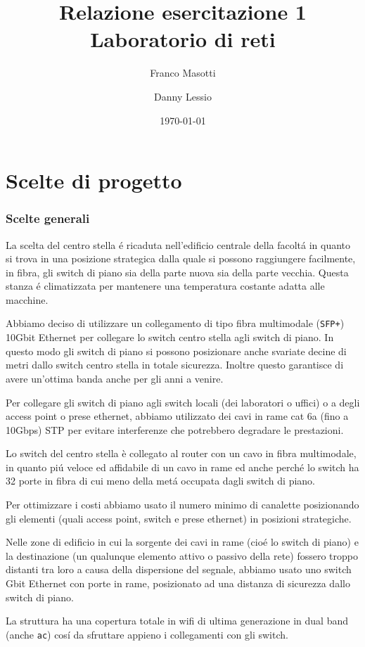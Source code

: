 \documentclass[11pt, a4paper, oneside]{article}
\title{Relazione esercitazione 1 Laboratorio di reti}
\author{Franco Masotti \and Danny Lessio}
\date{\today}
\begin{document}
	\maketitle
	\tableofcontents
	\listoffigures
	\listoftables
	\newpage
	\part{Scelte di progetto}
		\section{Scelte generali}
			\par
			La scelta del centro stella \'e ricaduta nell'edificio centrale della facolt\'a in quanto si trova in una posizione strategica dalla quale si possono raggiungere facilmente, in fibra, gli switch di piano sia della parte nuova sia della parte vecchia. Questa stanza \'e climatizzata per mantenere una temperatura costante adatta alle macchine. 
			\par
			Abbiamo deciso di utilizzare un collegamento di tipo fibra multimodale (\texttt{SFP+}) 10Gbit Ethernet per collegare lo switch centro stella agli switch di piano. In questo modo gli switch di piano si possono posizionare anche svariate decine di metri dallo switch centro stella in totale sicurezza. Inoltre questo garantisce di avere un'ottima banda anche per gli anni a venire.
			\par
			Per collegare gli switch di piano agli switch locali (dei laboratori o uffici) o a degli access point o prese ethernet, abbiamo utilizzato dei cavi in rame cat 6a (fino a 10Gbps) STP per evitare interferenze che potrebbero degradare le prestazioni.
			\par
			Lo switch del centro stella è collegato al router con un cavo in fibra multimodale, in quanto pi\'u veloce ed affidabile di un cavo in rame ed anche perch\'e lo switch ha 32 porte in fibra di cui meno della met\'a occupata dagli switch di piano.
			\par
			Per ottimizzare i costi abbiamo usato il numero minimo di canalette posizionando gli elementi (quali access point, switch e prese ethernet) in posizioni strategiche.
			\par
			Nelle zone di edificio in cui la sorgente dei cavi in rame (cio\'e lo switch di piano) e la destinazione (un qualunque elemento attivo o passivo della rete) fossero troppo distanti tra loro a causa della dispersione del segnale, abbiamo usato uno switch Gbit Ethernet con porte in rame, posizionato ad una distanza di sicurezza dallo switch di piano.
			\par
			La struttura ha una copertura totale in wifi di ultima generazione in dual band (anche \texttt{ac}) cos\'i da sfruttare appieno i collegamenti con gli switch.
\end{document}
